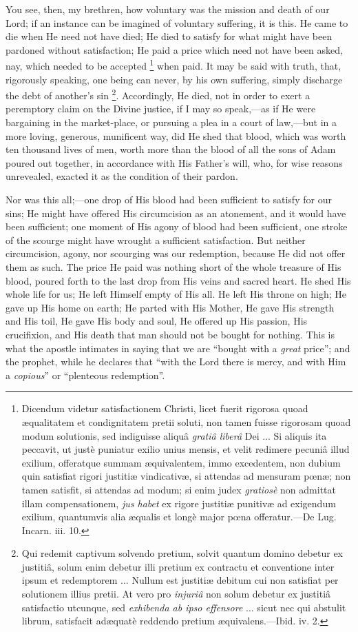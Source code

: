 You see, then, my brethren, how voluntary was the mission and death
of our Lord; if an instance can be imagined of voluntary suffering, it
is this. He came to die when He need not have died; He died to satisfy
for what might have been pardoned without satisfaction; He paid a
price which need not have been asked, nay, which needed to be accepted
\footnote{Dicendum videtur satisfactionem Christi,
licet fuerit rigorosa quoad æqualitatem et condignitatem pretii
soluti, non tamen fuisse rigorosam quoad modum solutionis, sed
indiguisse aliquâ \emph{gratiâ liberâ} Dei ... Si aliquis ita
peccavit, ut justè puniatur exilio unius mensis, et velit redimere
pecuniâ illud exilium, offeratque summam æquivalentem, immo
excedentem, non dubium quin satisfiat rigori justitiæ vindicativæ,
si attendas ad mensuram pœnæ; non tamen satisfit, si attendas ad
modum; si enim judex \emph{gratiosè} non admittat illam
compensationem, \emph{jus habet} ex rigore justitiæ punitivæ ad
exigendum exilium, quantumvis alia æqualis et longè major pœna
offeratur.—De Lug. Incarn. iii. 10.} when paid. It may be
said with truth, that, rigorously speaking, one being can never, by
his own suffering, simply discharge the debt of another's sin \footnote{Qui redemit captivum solvendo pretium,
solvit quantum domino debetur ex justitiâ, solum enim debetur illi
pretium ex contractu et conventione inter ipsum et redemptorem ...
Nullum est justitiæ debitum cui non satisfiat per solutionem illius
pretii. At vero pro \emph{injuriâ} non solum debetur ex justitiâ
satisfactio utcunque, sed \emph{exhibenda ab ipso effensore} ... sicut
nec qui abstulit librum, satisfacit adæquatè reddendo pretium
æquivalens.—Ibid. iv. 2.}. Accordingly, He died, not in order to exert a peremptory
claim on the Divine justice, if I may so speak,—as if He were
bargaining in the market-place, or pursuing a plea in a court of law,—but
in a more loving, generous, munificent way, did He shed that blood,
which was worth ten thousand lives of men, worth more than the blood
of all the sons of Adam poured out together, in accordance with His
Father's will, who, for wise reasons unrevealed, exacted it as the
condition of their pardon.

Nor was this all;—one drop of His blood had been sufficient to
satisfy for our sins; He might have offered His circumcision as an
atonement, and it would have been sufficient; one moment of His agony
of blood had been sufficient, one stroke of the scourge might have
wrought a sufficient satisfaction. But neither circumcision, agony,
nor scourging was our redemption, because He did not offer them as
such. The price He paid was nothing short of the whole treasure of His
blood, poured forth to the last drop from His veins and sacred heart.
He shed His whole life for us; He left Himself empty of His all. He
left His throne on high; He gave up His home on earth; He parted with
His Mother, He gave His strength and His toil, He gave His body and
soul, He offered up His passion, His crucifixion, and His death that
man should not be bought for nothing. This is what the apostle
intimates in saying that we are ``bought with a \emph{great}
price''; and the prophet, while he declares that ``with the
Lord there is mercy, and with Him a \emph{copious}'' or
``plenteous redemption''.

